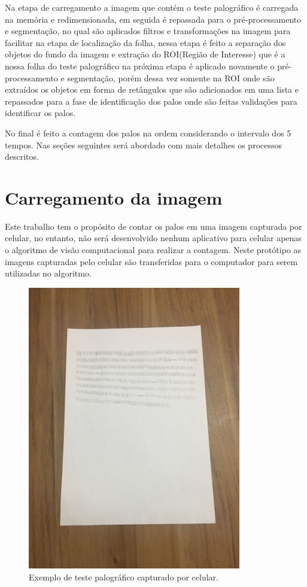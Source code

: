 Na etapa de carregamento a imagem que contém o teste palográfico é carregada na memória e redimensionada, em seguida é repassada para  o pré-processamento e segmentação, no qual são aplicados filtros e transformações na imagem para facilitar na etapa de localização  da folha, nessa etapa é feito a separação dos objetos  do fundo da imagem e extração do ROI(Região de Interesse) que é a nossa folha do teste palográfico na próxima etapa é aplicado novamente o pré-processamento e segmentação, porém dessa vez somente na ROI onde são extraídos os objetos em forma de retângulos que são adicionados em uma lista e repassados para a fase de identificação dos palos onde são feitas validações para identificar os palos. 

No final é feito a contagem dos palos na ordem considerando o intervalo dos 5 tempos. Nas seções seguintes será abordado com mais detalhes os processos descritos.

\section{Carregamento da imagem}
\label{sec:carrega-imagem}
Este trabalho tem o propósito de contar os palos em uma imagem capturada por celular, no entanto, não será desenvolvido nenhum aplicativo para celular apenas o algoritmo de visão computacional para realizar a contagem. Neste protótipo as imagens capturadas pelo celular são transferidas para o computador para serem utilizadas no algoritmo. 


\begin{figure}[H]
 \centering
 \includegraphics[width=0.83\textwidth]{./fig/desenvolvimento/teste-palos}
 \caption{Exemplo de teste palográfico capturado por celular.}
 \label{fig:ex-teste-palo}
\end{figure}


